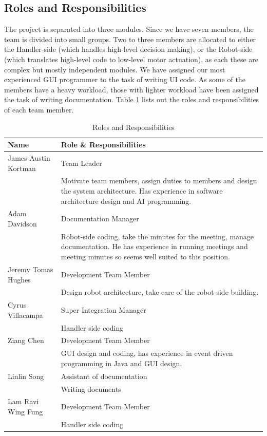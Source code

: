 \documentclass[12pt,a4paper]{article}
\begin{document}
	\subsection{Roles and Responsibilities}
    The project is separated into three modules.  Since we have seven members, the team is divided into small groups. Two to three members are allocated to either the Handler-side (which handles high-level decision making), or the Robot-side (which translates high-level code to low-level motor actuation), as each these are complex but mostly independent modules.  We have assigned our most experienced GUI programmer to the task of writing UI code.  As some of the members have a heavy workload, those with lighter workload have been assigned the task of writing documentation.  Table \ref{RolesTable} lists out the roles and responsibilities of each team member.
      	\begin{table}[h!t]
    	\centering
        \caption{Roles and Responsibilities}
        \label{RolesTable}
    	\begin{tabular}{ | l | p{8cm} |}
        \hline
        	Name & Role \& Responsibilities \\ \hline
            James Austin Kortman & 
            Team Leader
            \\  & Motivate team members, assign duties to members and design the system architecture. Has experience in software architecture design and AI programming.
            \\ \hline
            Adam Davidson  & 
            Documentation Manager
            \\ & Robot-side coding, take the minutes for the meeting, manage documentation. He has experience in running meetings and meeting minutes so seems well suited to this position.
            \\ \hline 
            Jeremy Tomas Hughes  &
            Development Team Member
            \\ & Design robot architecture, take care of the robot-side building.
            \\ \hline
            Cyrus Villacampa     &
            Super Integration Manager
            \\ & Handler side coding
            \\ \hline
            Ziang Chen			 &
            Development Team Member
            \\ & GUI design and coding, has experience in event driven programming in Java and GUI design.
            \\ \hline
            Linlin Song			 &
            Assistant of documentation
            \\ & Writing documents
            \\ \hline
            Lam Ravi Wing Fung   &
            Development Team Member
            \\ & Handler side coding
            \\ 
            \hline
       \end{tabular}
       \end{table}
	\newpage
    
\end{document}

